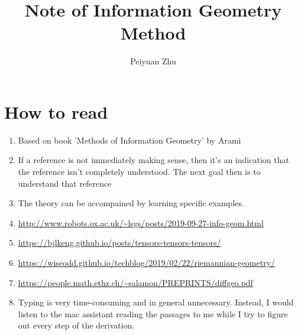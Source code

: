 \documentclass{article}
\title{Note of Information Geometry Method}
\author{Peiyuan Zhu}
\begin{document}
	\maketitle
	\section{How to read}
	\begin{enumerate}
		\item Based on book 'Methods of Information Geometry' by Arami
		\item If a reference is not immediately making sense, then it's an indication that the reference isn't completely understood. The next goal then is to understand that reference
		\item The theory can be accompained by learning specific examples.
		\item \url{http://www.robots.ox.ac.uk/~lsgs/posts/2019-09-27-info-geom.html}
		\item \url{https://bjlkeng.github.io/posts/tensors-tensors-tensors/}
		\item \url{https://wiseodd.github.io/techblog/2019/02/22/riemannian-geometry/}
		\item \url{https://people.math.ethz.ch/~salamon/PREPRINTS/diffgeo.pdf}
		\item Typing is very time-consuming and in general unnecessary. Instead, I would listen to the mac assistant reading the passages to me while I try to figure out every step of the derivation. 
	\end{enumerate}
\end{document}
